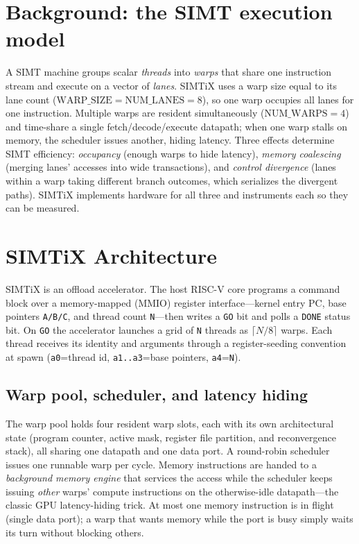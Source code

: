 \documentclass[conference]{IEEEtran}
\begin{document}
\section{Background: the SIMT execution model}
A SIMT machine groups scalar \emph{threads} into \emph{warps} that share one
instruction stream and execute on a vector of \emph{lanes}. SIMTiX uses a warp
size equal to its lane count ($\mathrm{WARP\_SIZE}=\mathrm{NUM\_LANES}=8$), so
one warp occupies all lanes for one instruction. Multiple warps are resident
simultaneously ($\mathrm{NUM\_WARPS}=4$) and time-share a single
fetch/decode/execute datapath; when one warp stalls on memory, the scheduler
issues another, hiding latency. Three effects determine SIMT efficiency:
\emph{occupancy} (enough warps to hide latency), \emph{memory coalescing}
(merging lanes' accesses into wide transactions), and \emph{control divergence}
(lanes within a warp taking different branch outcomes, which serializes the
divergent paths). SIMTiX implements hardware for all three and instruments each
so they can be measured.

\section{SIMTiX Architecture}\label{sec:arch}
SIMTiX is an offload accelerator. The host RISC-V core programs a command block
over a memory-mapped (MMIO) register interface---kernel entry PC, base pointers
\texttt{A/B/C}, and thread count \texttt{N}---then writes a \texttt{GO} bit and
polls a \texttt{DONE} status bit. On \texttt{GO} the accelerator launches a grid
of \texttt{N} threads as $\lceil N/8\rceil$ warps. Each thread receives its
identity and arguments through a register-seeding convention at spawn
(\texttt{a0}=thread id, \texttt{a1..a3}=base pointers, \texttt{a4}=\texttt{N}).

\subsection{Warp pool, scheduler, and latency hiding}
The warp pool holds four resident warp slots, each with its own architectural
state (program counter, active mask, register file partition, and reconvergence
stack), all sharing one datapath and one data port. A round-robin scheduler
issues one runnable warp per cycle. Memory instructions are handed to a
\emph{background memory engine} that services the access while the scheduler
keeps issuing \emph{other} warps' compute instructions on the otherwise-idle
datapath---the classic GPU latency-hiding trick. At most one memory instruction
is in flight (single data port); a warp that wants memory while the port is busy
simply waits its turn without blocking others.
\end{document}
